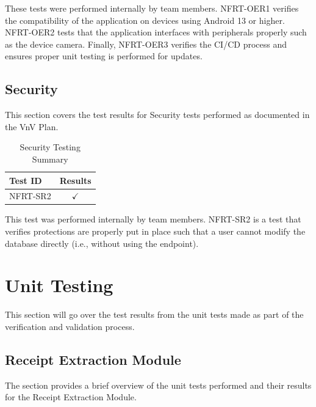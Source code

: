 \documentclass[12pt, titlepage]{article}
\begin{document}
These tests were performed internally by team members. NFRT-OER1 verifies the compatibility of the application
on devices using Android 13 or higher. NFRT-OER2 tests that the application interfaces with peripherals properly
such as the device camera. Finally, NFRT-OER3 verifies the CI/CD process and ensures proper unit testing is performed
for updates.

\subsection{Security}

This section covers the test results for Security tests performed as documented in the VnV Plan.

\begin{longtable}{|l|c|}
  \caption{Security Testing Summary} \label{Security Testing Summary} \\
  \toprule
  \textbf{Test ID} & \textbf{Results} \\
  \midrule
  NFRT-SR2 & $\checkmark$ \\
  \bottomrule
\end{longtable}

This test was performed internally by team members. NFRT-SR2 is a test that verifies protections are properly put in
place such that a user cannot modify the database directly (i.e., without using the endpoint).
	


\section{Unit Testing}

This section will go over the test results from the unit tests made as part of the
verification and validation process.

\subsection{Receipt Extraction Module}

The section provides a brief overview of the unit tests performed and their results for the
Receipt Extraction Module.
\end{document}

